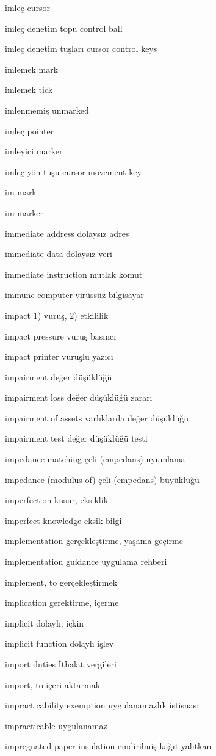 \documentclass[12pt,fleqn]{article}\usepackage{../../common}
\begin{document}
imleç cursor

imleç denetim topu control ball

imleç denetim tuşları cursor control keys

imlemek mark

imlemek tick

imlenmemiş unmarked

imleç pointer

imleyici marker

imleç yön tuşu cursor movement key

im mark

im marker

immediate address dolaysız adres

immediate data dolaysız veri

immediate instruction mutlak komut

immune computer virüssüz bilgisayar

impact 1) vuruş, 2) etkililik

impact pressure vuruş basıncı

impact printer vuruşlu yazıcı

impairment değer düşüklüğü

impairment loss değer düşüklüğü zararı

impairment of assets varlıklarda değer düşüklüğü

impairment test değer düşüklüğü testi

impedance matching çeli (empedans) uyumlama

impedance (modulus of) çeli (empedans) büyüklüğü

imperfection kusur, eksiklik

imperfect knowledge eksik bilgi

implementation gerçekleştirme, yaşama geçirme

implementation guidance uygulama rehberi

implement, to gerçekleştirmek

implication gerektirme, içerme

implicit dolaylı; içkin

implicit function dolaylı işlev

import duties İthalat vergileri

import, to içeri aktarmak

impracticability exemption uygulanamazlık istisnası

impracticable uygulanamaz

impregnated paper insulation emdirilmiş kağıt yalıtkan
\end{document}

